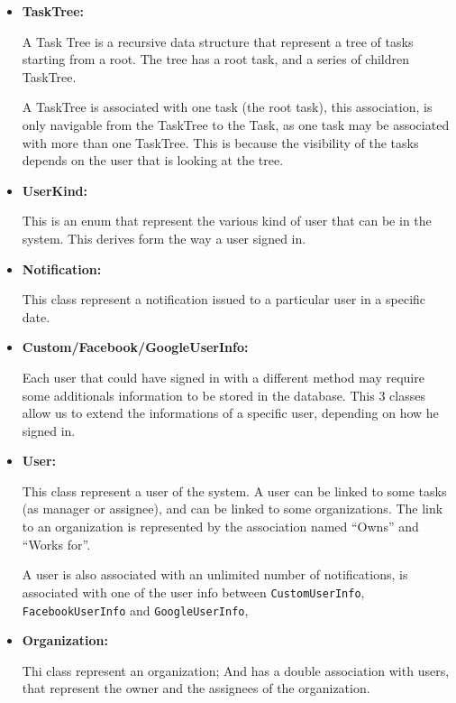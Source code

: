 \documentclass{article}
\begin{document}
\begin{itemize}
    \item \textbf{TaskTree: }
    
    A Task Tree is a recursive data structure that represent a tree of tasks starting from a root.
    The tree has a root task, and a series of children TaskTree.

    A TaskTree is associated with one task (the root task), this association, is only navigable from the TaskTree to the Task,
    as one task may be associated with more than one TaskTree. This is because
    the visibility of the tasks depends on the user that is looking at the tree.

    \item \textbf{UserKind: }

    This is an enum that represent the various kind of user that can be in the system.
    This derives form the way a user signed in.

    \item \textbf{Notification: }
    
    This class represent a notification issued to a particular user in a specific date.

    \item \textbf{Custom/Facebook/GoogleUserInfo: }
    
    Each user that could have signed in with a different method may require some additionals
    information to be stored in the database. This 3 classes allow us to extend the informations
    of a specific user, depending on how he signed in.

    \item \textbf{User: }
    
    This class represent a user of the system. A user can be linked to some tasks (as manager or assignee),
    and can be linked to some organizations.
    The link to an organization is represented by the association named ``Owns'' and ``Works for''.

    A user is also associated with an unlimited number of notifications, is associated
    with one of the user info between \texttt{CustomUserInfo}, \texttt{FacebookUserInfo} and \texttt{GoogleUserInfo},

    \item \textbf{Organization: }
    
    Thi class represent an organization; And has a double association with users, that represent the owner and the assignees of the organization.
\end{itemize}
\end{document}
